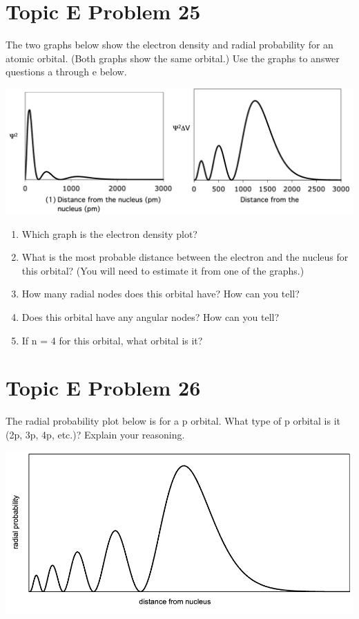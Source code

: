 \documentclass[10pt]{article}
\begin{document}
    \section{Topic E Problem 25}
        The two graphs below show the electron density and radial probability for an atomic orbital.
        (Both graphs show the same orbital.) 
        Use the graphs to answer questions a through e below.
        \begin{center}
            \includegraphics[width=\textwidth]{img-E25.png}
        \end{center}

        \begin{enumerate}[label=\alph*)]
            \item   Which graph is the electron density plot?
            \item   What is the most probable distance between the electron and the nucleus for this orbital? (You will need to estimate it from one of the graphs.)
            \item   How many radial nodes does this orbital have? How can you tell?
            \item   Does this orbital have any angular nodes? How can you tell?
            \item   If n = 4 for this orbital, what orbital is it?
        \end{enumerate}

    \pagebreak
    \section{Topic E Problem 26}
        The radial probability plot below is for a p orbital. 
        What type of p orbital is it (2p, 3p, 4p, etc.)? 
        Explain your reasoning.
        \begin{center}
            \includegraphics[width=\textwidth]{img-E26.png}
        \end{center}
\end{document}
